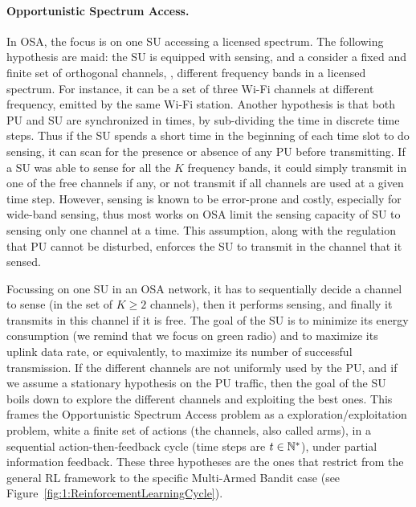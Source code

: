 \paragraph{Opportunistic Spectrum Access.}
%
In OSA, the focus is on one SU accessing a licensed spectrum.
%
The following hypothesis are maid:
the SU is equipped with sensing,
and a consider a fixed and finite set of orthogonal channels, \ie, different frequency bands in a licensed spectrum.
For instance, it can be a set of three Wi-Fi channels at different frequency, emitted by the same Wi-Fi station.
Another hypothesis is that both PU and SU are synchronized in times, by sub-dividing the time in discrete time steps.
%
Thus if the SU spends a short time in the beginning of each time slot to do sensing, it can scan for the presence or absence of any PU before transmitting.
If a SU was able to sense for all the $K$ frequency bands, it could simply transmit in one of the free channels if any, or not transmit if all channels are used at a given time step.
However, sensing is known to be error-prone and costly, especially for wide-band sensing, thus most works on OSA limit the sensing capacity of SU to sensing only one channel at a time. This assumption, along with the regulation that PU cannot be disturbed, enforces the SU to transmit in the channel that it sensed.

Focussing on one SU in an OSA network, it has to sequentially decide a channel to sense (in the set of $K\geq2$ channels), then it performs sensing, and finally it transmits in this channel if it is free.
The goal of the SU is to minimize its energy consumption (we remind that we focus on green radio) and to maximize its uplink data rate, or equivalently, to maximize its number of successful transmission.
%
If the different channels are not uniformly used by the PU, and if we assume a stationary hypothesis on the PU traffic, then the goal of the SU boils down to explore the different channels and exploiting the best ones.
This frames the Opportunistic Spectrum Access problem as a exploration/exploitation problem, white a finite set of actions (the channels, also called arms),
in a sequential action-then-feedback cycle (time steps are $t\in\mathbb{N}^*$),
under partial information feedback.
These three hypotheses are the ones that restrict from the general RL framework to the specific Multi-Armed Bandit case (see Figure~\ref{fig:1:ReinforcementLearningCycle}).


